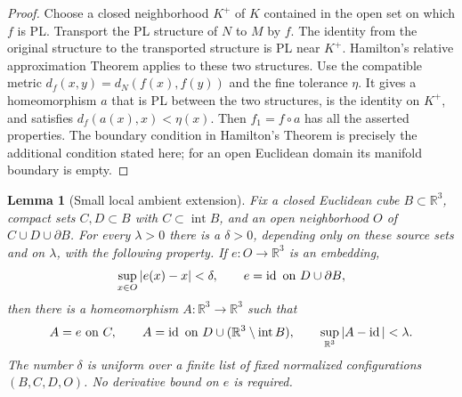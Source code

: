 \documentclass[11pt]{article}
\numberwithin{equation}{section}
\newtheorem{lemma}[theorem]{Lemma}
\theoremstyle{definition}
\theoremstyle{remark}
\begin{document}
\begin{proof}
Choose a closed neighborhood $K^+$ of $K$ contained in the open set on
which $f$ is PL.  Transport the PL structure of $N$ to $M$ by $f$.
The identity from the original structure to the transported structure
is PL near $K^+$.  Hamilton's relative approximation Theorem
\cite[Section~3, Theorem~2.2, pp.~68--69]{Hamilton1976} applies to these
two structures.  Use the compatible metric
$d_f(x,y)=d_N(f(x),f(y))$ and the fine tolerance $\eta$.
It gives a homeomorphism $a$ that is PL between the two structures,
is the identity on $K^+$, and satisfies
$d_f(a(x),x)<\eta(x)$.  Then $f_1=f\circ a$ has all the asserted
properties.  The boundary condition in Hamilton's Theorem is precisely
the additional condition stated here; for an open Euclidean domain its
manifold boundary is empty.
\end{proof}

\begin{lemma}[Small local ambient extension]
\label{sm:local-extension}
Fix a closed Euclidean cube $B\subset\mathbb R^3$, compact sets $C,D\subset B$
with $C\subset\operatorname{int}B$, and an open neighborhood $O$ of
$C\cup D\cup\partial B$.  For every $\lambda>0$ there is a
$\delta>0$, depending only on these source sets and on $\lambda$,
with the following property.  If $e:O\to\mathbb R^3$ is an embedding,
\[
 \sup_{x\in O}|e(x)-x|<\delta,
 \qquad e=\operatorname{id}\ \hbox{on }D\cup\partial B,
\]
then there is a homeomorphism $A:\mathbb R^3\to\mathbb R^3$ such that
\begin{equation}
 \label{sm:extension-conclusion}
 A=e\ \hbox{on }C,\qquad
 A=\operatorname{id}\ \hbox{on }D\cup(\mathbb R^3\setminus\operatorname{int}B),
 \qquad \sup_{\mathbb R^3}|A-\operatorname{id}|<\lambda.
\end{equation}
The number $\delta$ is uniform over a finite list of fixed normalized
configurations $(B,C,D,O)$.  No derivative bound on $e$ is required.
\end{lemma}
\end{document}
